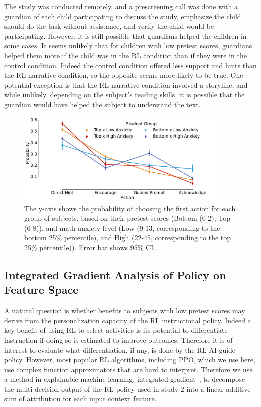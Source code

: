 \documentclass[sn-mathphys,Numbered]{sn-jnl}%
\theoremstyle{thmstyleone}%
\theoremstyle{thmstyletwo}%
\theoremstyle{thmstylethree}%
\begin{document}
The study was conducted remotely, and a prescreening call was done with a guardian of each child participating to discuss the study, emphasize the child should do the task without assistance, and verify the child would be participating. However, it is still possible that guardians helped the children in some cases. It seems unlikely that for children with low pretest scores, guardians helped them more if the child was in the RL condition than if they were in the control condition. Indeed the control condition offered less support and hints than the RL narrative condition, so the opposite seems more likely to be true. One potential exception is that the RL narrative condition involved a storyline, and while unlikely, depending on the subject's reading skills, it is possible that the guardian would have helped the subject to understand the text. 


\begin{figure}[tb!]
\centering
    \includegraphics[width=0.9\textwidth]{Figures/average_step_action_distribution_grouped_by_pretest_and_math_anxiety_paper.pdf}
  \caption{The y-axis shows the probability of choosing the first action  for each group of subjects, based on their pretest scores (Bottom (0-2), Top (6-8)), and math anxiety level (Low (9-13, corresponding to the bottom 25\% percentile), and High (22-45, corresponding to the top 25\% percentile)).  Error bar shows 95\% CI.}
      \label{rlbot:fig:first_step}
 \end{figure}

\subsection{Integrated Gradient Analysis of Policy on Feature Space}
A natural question is whether benefits to subjects with low pretest scores may derive from the personalization capacity of the RL instructional policy.  Indeed a key benefit of using RL to select activities is its potential to differentiate instruction if doing so is estimated to improve outcomes. Therefore it is of interest to evaluate what differentiation, if any, is done by the RL AI guide policy. However, 
most popular RL algorithms, including PPO, which we use here, use complex function approximators that are hard to interpret. Therefore we  use a method in explainable machine learning, integrated gradient~\cite{sundararajan2017axiomatic}, to decompose the multi-decision output of the RL policy used in study 2 into a linear additive sum of attribution for each input context feature. 
\end{document}
